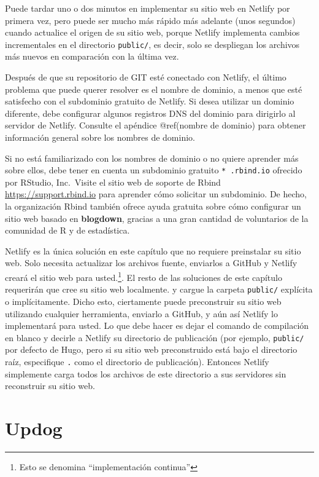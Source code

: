\documentclass[12pt,]{krantz}
\theoremstyle{definition}
\theoremstyle{definition}
\theoremstyle{definition}
\theoremstyle{remark}
\begin{document}
Puede tardar uno o dos minutos en implementar su sitio web en Netlify
por primera vez, pero puede ser mucho más rápido más adelante (unos
segundos) cuando actualice el origen de su sitio web, porque Netlify
implementa cambios incrementales en el directorio \texttt{public/}, es
decir, solo se despliegan los archivos más nuevos en comparación con la
última vez.

Después de que su repositorio de GIT esté conectado con Netlify, el
último problema que puede querer resolver es el nombre de
dominio, a menos que esté satisfecho con el
subdominio gratuito de Netlify. Si desea utilizar un dominio diferente,
debe configurar algunos registros DNS del dominio para dirigirlo al
servidor de Netlify. Consulte el apéndice @ref(nombre de dominio) para
obtener información general sobre los nombres de dominio.

Si no está familiarizado con los nombres de dominio o no quiere aprender
más sobre ellos, debe tener en cuenta un subdominio gratuito
\texttt{*\ .rbind.io} ofrecido por RStudio, Inc.~Visite el sitio web de
soporte de Rbind \url{https://support.rbind.io} para aprender cómo
solicitar un subdominio. De hecho, la organización Rbind también ofrece
ayuda gratuita sobre cómo configurar un sitio web basado en
\textbf{blogdown}, gracias a una gran cantidad de voluntarios de la
comunidad de R y de estadística.

Netlify es la única solución en este capítulo que no requiere
preinstalar su sitio web. Solo necesita actualizar los archivos fuente,
enviarlos a GitHub y Netlify creará el sitio web para usted.\footnote{Esto
  se denomina ``implementación continua''}. El resto de las soluciones
de este capítulo requerirán que cree su sitio web localmente. y cargue
la carpeta \texttt{public/} explícita o implícitamente. Dicho esto,
ciertamente puede preconstruir su sitio web utilizando cualquier
herramienta, enviarlo a GitHub, y aún así Netlify lo implementará para
usted. Lo que debe hacer es dejar el comando de compilación en blanco y
decirle a Netlify su directorio de publicación (por ejemplo,
\texttt{public/} por defecto de Hugo, pero si su sitio web preconstruido
está bajo el directorio raíz, especifique \texttt{.} como el directorio
de publicación). Entonces Netlify simplemente carga todos los archivos
de este directorio a sus servidores sin reconstruir su sitio web.

\hypertarget{updog}{%
\section{Updog}\label{updog}}
\end{document}
